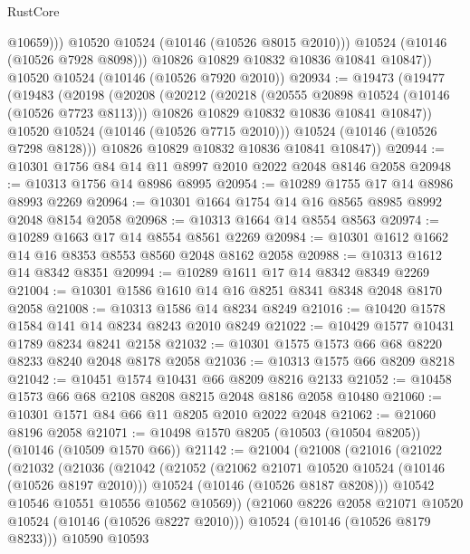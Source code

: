 \begin{lexlean}{RustCore}
\begin{coremodule}
                  @10659)))
            @10520
            @10524
            (@10146 (@10526 @8015 @2010)))
          @10524
          (@10146 (@10526 @7928 @8098)))
        @10826
        @10829
        @10832
        @10836
        @10841
        @10847))
    @10520
    @10524
    (@10146 (@10526 @7920 @2010))
@20934 := @19473
    (@19477
      (@19483
        (@20198
          (@20208
            (@20212
              (@20218
                (@20555 @20898 @10524 (@10146 (@10526 @7723 @8113)))
                @10826
                @10829
                @10832
                @10836
                @10841
                @10847))
            @10520
            @10524
            (@10146 (@10526 @7715 @2010)))
          @10524
          (@10146 (@10526 @7298 @8128)))
        @10826
        @10829
        @10832
        @10836
        @10841
        @10847))
@20944 := @10301 @1756 @84 @14 @11 @8997 @2010 @2022 @2048 @8146 @2058
@20948 := @10313 @1756 @14 @8986 @8995
@20954 := @10289 @1755 @17 @14 @8986 @8993 @2269
@20964 := @10301 @1664 @1754 @14 @16 @8565 @8985 @8992 @2048 @8154 @2058
@20968 := @10313 @1664 @14 @8554 @8563
@20974 := @10289 @1663 @17 @14 @8554 @8561 @2269
@20984 := @10301 @1612 @1662 @14 @16 @8353 @8553 @8560 @2048 @8162 @2058
@20988 := @10313 @1612 @14 @8342 @8351
@20994 := @10289 @1611 @17 @14 @8342 @8349 @2269
@21004 := @10301 @1586 @1610 @14 @16 @8251 @8341 @8348 @2048 @8170 @2058
@21008 := @10313 @1586 @14 @8234 @8249
@21016 := @10420 @1578 @1584 @141 @14 @8234 @8243 @2010 @8249
@21022 := @10429 @1577 @10431 @1789 @8234 @8241 @2158
@21032 := @10301 @1575 @1573 @66 @68 @8220 @8233 @8240 @2048 @8178 @2058
@21036 := @10313 @1575 @66 @8209 @8218
@21042 := @10451 @1574 @10431 @66 @8209 @8216 @2133
@21052 := @10458 @1573 @66 @68 @2108 @8208 @8215 @2048 @8186 @2058 @10480
@21060 := @10301 @1571 @84 @66 @11 @8205 @2010 @2022 @2048
@21062 := @21060 @8196 @2058
@21071 := @10498 @1570 @8205 (@10503 (@10504 @8205)) (@10146 (@10509 @1570 @66))
@21142 := @21004
    (@21008
      (@21016
        (@21022
          (@21032
            (@21036
              (@21042
                (@21052
                  (@21062 @21071 @10520 @10524 (@10146 (@10526 @8197 @2010)))
                  @10524
                  (@10146 (@10526 @8187 @8208)))
                @10542
                @10546
                @10551
                @10556
                @10562
                @10569))
            (@21060 @8226 @2058 @21071 @10520 @10524 (@10146 (@10526 @8227 @2010)))
            @10524
            (@10146 (@10526 @8179 @8233)))
          @10590
          @10593

\end{coremodule}
\end{lexlean}
